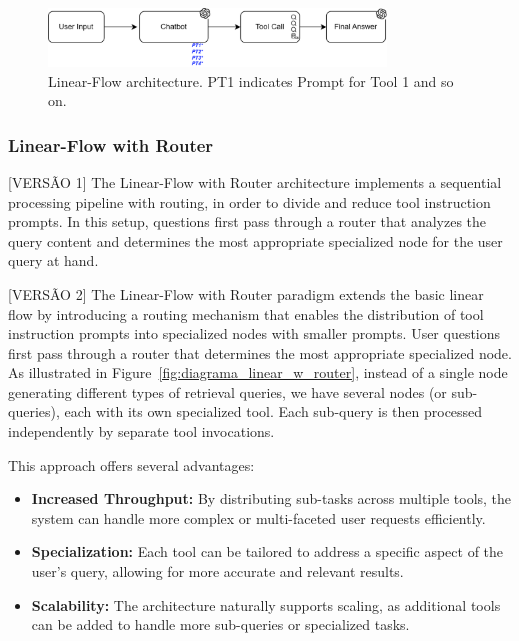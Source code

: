                 \begin{figure}[h]
                    \centering
                    \includegraphics[width=0.8\textwidth]{images_exp2/diagrams/diagrama_linear_flow.png}
                    \caption{Linear-Flow architecture. PT1 indicates Prompt for Tool 1 and so on.}
                    \label{fig:diagrama_linear_flow}
                \end{figure}
           

            \subsubsection{Linear-Flow with Router}

                [VERSÃO 1]
                The Linear-Flow with Router architecture implements a sequential processing pipeline with routing, in order to divide and reduce tool instruction prompts. In this setup, questions first pass through a router that analyzes the query content and determines the most appropriate specialized node for the user query at hand. 
                
                [VERSÃO 2]
                The Linear-Flow with Router paradigm extends the basic linear flow by introducing a routing mechanism that enables the distribution of tool instruction prompts into specialized nodes with smaller prompts. User questions first pass through a router that determines the most appropriate specialized node. As illustrated in Figure~\ref{fig:diagrama_linear_w_router}, instead of a single node generating different types of retrieval queries, we have several nodes (or sub-queries), each with its own specialized tool. Each sub-query is then processed independently by separate tool invocations.
                    
                This approach offers several advantages:

                \begin{itemize}

                    \item \textbf{Increased Throughput:} By distributing sub-tasks across multiple tools, the system can handle more complex or multi-faceted user requests efficiently.
                    
                    \item \textbf{Specialization:} Each tool can be tailored to address a specific aspect of the user's query, allowing for more accurate and relevant results.
                    
                    \item \textbf{Scalability:} The architecture naturally supports scaling, as additional tools can be added to handle more sub-queries or specialized tasks.
                    
                \end{itemize}
                
